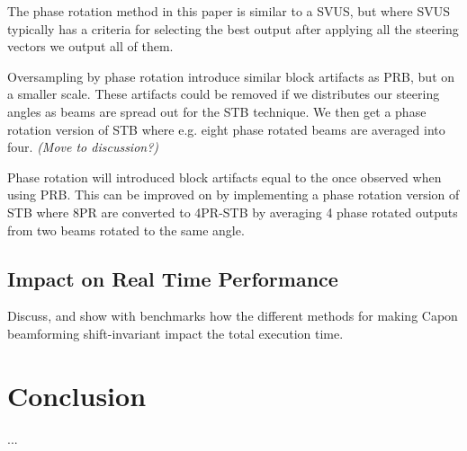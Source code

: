 \documentclass[journal]{IEEEtran}
\newcommand\comment[1]{\textit{{\color{red}(#1)}}}
\begin{document}
The phase rotation method in this paper is similar to a SVUS, but where SVUS typically has a criteria for selecting the best output after applying all the steering vectors we output all of them.

Oversampling by phase rotation introduce similar block artifacts as PRB, but on a smaller scale. These artifacts could be removed if we distributes our steering angles as beams are spread out for the STB technique. We then get a phase rotation version of STB where e.g. eight phase rotated beams are averaged into four. \comment{Move to discussion?}

Phase rotation will introduced block artifacts equal to the once observed when using PRB. This can be improved on by implementing a phase rotation version of STB where 8PR are converted to 4PR-STB by averaging 4 phase rotated outputs from two beams rotated to the same angle. 

\subsection{Impact on Real Time Performance}
Discuss, and show with benchmarks how the different methods for making Capon beamforming shift-invariant impact the total execution time.

\section{Conclusion}\label{sec:con}
...


%
%
\end{document}
